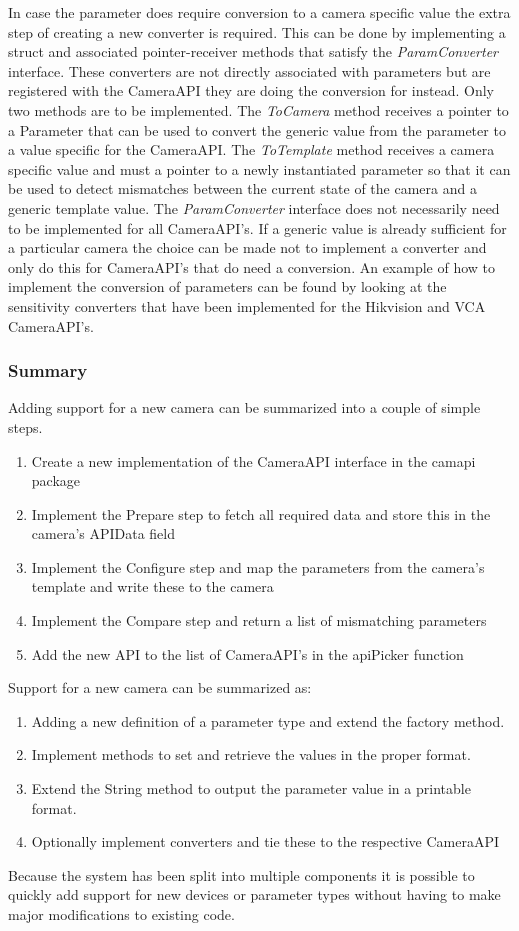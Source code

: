 In case the parameter does require conversion to a camera specific value the extra step of creating a new converter is required.
This can be done by implementing a struct and associated pointer-receiver methods that satisfy the \emph{ParamConverter} interface.
These converters are not directly associated with parameters but are registered with the CameraAPI they are doing the conversion for instead.
Only two methods are to be implemented.
The \emph{ToCamera} method receives a pointer to a Parameter that can be used to convert the generic value from the parameter to a value specific for the CameraAPI.
The \emph{ToTemplate} method receives a camera specific value and must a pointer to a newly instantiated parameter so that it can be used to detect mismatches between the current state of the camera and  a generic template value.
The \emph{ParamConverter} interface does not necessarily need to be implemented for all CameraAPI's.
If a generic value is already sufficient for a particular camera the choice can be made not to implement a converter and only do this for CameraAPI's that do need a conversion.
An example of how to implement the conversion of parameters can be found by looking at the sensitivity converters that have been implemented for the Hikvision and VCA CameraAPI's.

\subsubsection{Summary}
Adding support for a new camera can be summarized into a couple of simple steps.
\begin{enumerate}
	\item Create a new implementation of the CameraAPI interface in the camapi package
	\item Implement the Prepare step to fetch all required data and store this in the camera's APIData field
	\item Implement the Configure step and map the parameters from the camera's template and write these to the camera
	\item Implement the Compare step and return a list of mismatching parameters
	\item Add the new API to the list of CameraAPI's in the apiPicker function
\end{enumerate}

Support for a new camera can be summarized as:
\begin{enumerate}
	\item Adding a new definition of a parameter type and extend the factory method.
	\item Implement methods to set and retrieve the values in the proper format.
	\item Extend the String method to output the parameter value in a printable format.
	\item Optionally implement converters and tie these to the respective CameraAPI
\end{enumerate}

Because the system has been split into multiple components it is possible to quickly add support for new devices or parameter types without having to make major modifications to existing code.
